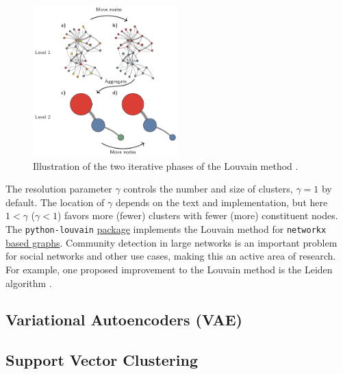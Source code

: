 \begin{figure}
\centering
\includegraphics[width=0.5\textwidth]{figures/ml/louvain_algo}
\caption{
Illustration of the two iterative phases of the Louvain method \cite{leiden}.
}
\label{fig:louvain}
\end{figure}

The resolution parameter $\gamma$ controls the number and size of clusters, $\gamma =1$ by default.
The location of $\gamma$ depends on the text and implementation,
but here $1 < \gamma$ ($\gamma < 1$) favors more (fewer) clusters with fewer (more) constituent nodes.
The \texttt{python-louvain}
\href{https://python-louvain.readthedocs.io/en/latest/}{package} \cite{python-louvain}
implements the Louvain method for \texttt{networkx} \cite{networkx}
\href{https://networkx.org/}{based graphs}.
Community detection in large networks is an important problem for social networks and other use cases,
making this an active area of research.
For example, one proposed improvement to the Louvain method is the Leiden algorithm \cite{leiden}.

\subsection{Variational Autoencoders (VAE)}
\label{additional:unsupervised:VAE}

\subsection{Support Vector Clustering}
\label{additional:unsupervised:SVC}


